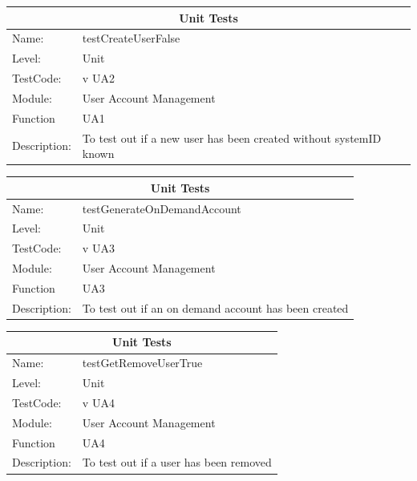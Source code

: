 \documentclass[12pt]{article}
\begin{document}
\begin{center}
\begin{tabular}{|l|p{12cm}|}
\hline
\multicolumn{2}{|c|}{\bf Unit Tests} \\
\hline
 Name: & testCreateUserFalse \\
\hline
Level: & Unit \\
\hline
TestCode: & v UA2 \\
\hline
Module:& User Account Management\\
\hline
Function & UA1 \\
\hline
Description: & To test out if a new user has been created without systemID known\\
\hline

\end{tabular}
\end{center}

\begin{center}
\begin{tabular}{|l|p{12cm}|}
\hline
\multicolumn{2}{|c|}{\bf Unit Tests} \\
\hline
 Name: & testGenerateOnDemandAccount \\
\hline
Level: & Unit \\
\hline
TestCode: & v UA3 \\
\hline
Module:& User Account Management\\
\hline
Function & UA3 \\
\hline
Description: & To test out if an on demand account has been created \\
\hline

\end{tabular}
\end{center}

\begin{center}
\begin{tabular}{|l|p{12cm}|}
\hline
\multicolumn{2}{|c|}{\bf Unit Tests} \\
\hline
 Name: & testGetRemoveUserTrue \\
\hline
Level: & Unit \\
\hline
TestCode: & v UA4 \\
\hline
Module:& User Account Management\\
\hline
Function & UA4 \\
\hline
Description: & To test out if a user has been removed \\
\hline

\end{tabular}
\end{center}
\end{document}
